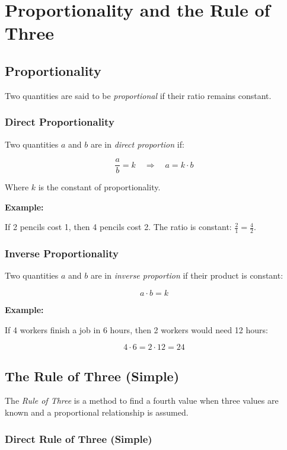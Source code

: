 \newpage
\section{Proportionality and the Rule of Three}

\subsection{Proportionality}

Two quantities are said to be \emph{proportional} if their ratio remains constant.

\subsubsection{Direct Proportionality}

Two quantities \(a\) and \(b\) are in \emph{direct proportion} if:

\[
    \frac{a}{b} = k \quad \Rightarrow \quad a = k \cdot b
\]

Where \(k\) is the constant of proportionality.

\textbf{Example:}

If 2 pencils cost 1, then 4 pencils cost 2. The ratio is constant: \(\frac{2}{1} = \frac{4}{2}\).

\subsubsection{Inverse Proportionality}

Two quantities \(a\) and \(b\) are in \emph{inverse proportion} if their product is constant:

\[
    a \cdot b = k
\]

\textbf{Example:}

If 4 workers finish a job in 6 hours, then 2 workers would need 12 hours:

\[
    4 \cdot 6 = 2 \cdot 12 = 24
\]

\subsection{The Rule of Three (Simple)}

The \emph{Rule of Three} is a method to find a fourth value when three values are known and a 
proportional relationship is assumed.

\subsubsection{Direct Rule of Three (Simple)}

